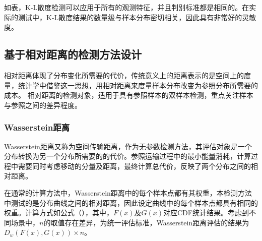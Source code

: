 
如表，K-L散度检测可以应用于所有的观测特征，并且判别标准都是相同的。在实际的测试中，K-L散度结果的数量级与样本分布密切相关，因此具有非常好的灵敏度。

\subsection{基于相对距离的检测方法设计}
\label{chap:analyze:statistical:distance}

相对距离体现了分布变化所需要的代价，传统意义上的距离表示的是空间上的度量，统计学中借鉴这一思想，用相对距离来度量样本分布改变为参照分布所需要的成本。
相对距离的检测对象，适用于具有参照样本的双样本检测，重点关注样本与参照之间的差异程度。

\subsubsection{Wasserstein距离}
\label{chap:analyze:statistical:distance:wasserstein}

Wasserstein距离又称为空间传输距离，作为无参数检测方法，其评估对象是一个分布转换为另一个分布所需要的的代价。参照运输过程中的最小能量消耗，计算过程中需要同时考虑移动的分量及距离，最终计算总代价，反映了两个分布之间的相对距离。


在通常的计算方法中，Wasserstein距离中的每个样本点都有其权重，本检测方法中测试的是分布曲线之间的相对距离，因此设定曲线中的每个样本点都具有相同的权重。计算方式如公式（），其中，$F(x)$及$G(x)$对应CDF统计结果。考虑到不同场景中，$n$的取值存在差异，为统一评估标准，Wasserstein距离评估的结果为$D_{w}(F(x),G(x))\times n$。


